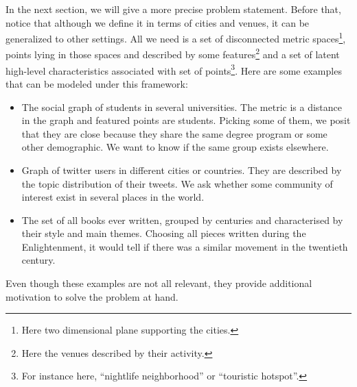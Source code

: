 In the next section, we will give a more precise problem statement. Before
that, notice that although we define it in terms of cities and venues, it can
be generalized to other settings. All we need is a set of disconnected metric
spaces\footnote{Here two dimensional plane supporting the cities.}, points
lying in those spaces and described by some features\footnote{Here the venues
described by their activity.} and a set of latent high-level characteristics
associated with set of points\footnote{For instance here, \enquote{nightlife
neighborhood} or \enquote{touristic hotspot}.}. Here are some examples that
can be modeled under this framework:
\begin{itemize}
	\item The social graph of students in several universities. The metric
		is a distance in the graph and featured points are students.
		Picking some of them, we posit that they are close because
		they share the same degree program or some other demographic.
		We want to know if the same group exists elsewhere.
	\item Graph of twitter users in different cities or countries. They
		are described by the topic distribution of their tweets. We
		ask whether some community of interest exist in several places
		in the world.
	\item The set of all books ever written, grouped by centuries and
		characterised by their style and main themes. Choosing all
		pieces written during the Enlightenment, it would tell if
		there was a similar movement in the twentieth century.
\end{itemize}
Even though these examples are not all relevant, they provide additional
motivation to solve the problem at hand.
